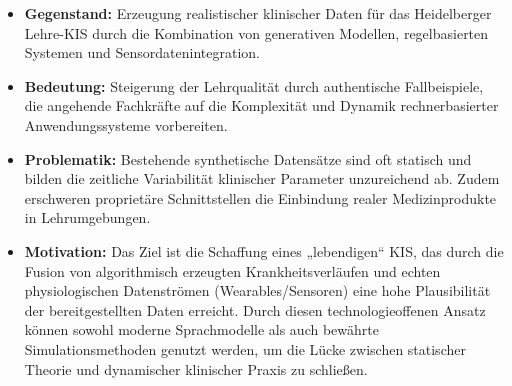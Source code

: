 \begin{itemize}
    \item \textbf{Gegenstand:} Erzeugung realistischer klinischer Daten für das Heidelberger Lehre-KIS durch die Kombination von generativen Modellen, regelbasierten Systemen und Sensordatenintegration.
    \item \textbf{Bedeutung:} Steigerung der Lehrqualität durch authentische Fallbeispiele, die angehende Fachkräfte auf die Komplexität und Dynamik rechnerbasierter Anwendungssysteme vorbereiten.
    \item \textbf{Problematik:} Bestehende synthetische Datensätze sind oft statisch und bilden die zeitliche Variabilität klinischer Parameter unzureichend ab. Zudem erschweren proprietäre Schnittstellen die Einbindung realer Medizinprodukte in Lehrumgebungen.
    \item \textbf{Motivation:} Das Ziel ist die Schaffung eines „lebendigen“ KIS, das durch die Fusion von algorithmisch erzeugten Krankheitsverläufen und echten physiologischen Datenströmen (Wearables/Sensoren) eine hohe Plausibilität der bereitgestellten Daten erreicht. Durch diesen technologieoffenen Ansatz können sowohl moderne Sprachmodelle als auch bewährte Simulationsmethoden genutzt werden, um die Lücke zwischen statischer Theorie und dynamischer klinischer Praxis zu schließen.
\end{itemize}